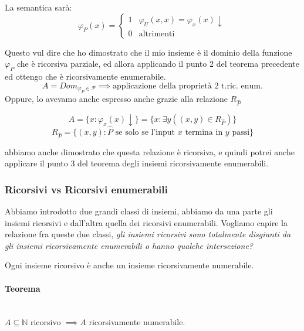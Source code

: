 \documentclass{article}
\begin{document}
La semantica sarà:
\[
    \varphi_P(x)=
    \begin{cases}
        1 & \varphi_U(x,x)=\varphi_x(x)\downarrow\\
        0 & \text{altrimenti}
    \end{cases}
\]

Questo vul dire che ho dimostrato che il mio insieme è il dominio della
funzione $\varphi_P$ che è ricorsiva parziale, ed allora applicando
il punto 2 del teorema precedente ed ottengo che è ricorsivamente
enumerabile.
$$A=Dom_{\varphi_P\in\mathcal{P}}\implies\text{applicazione della proprietà 2 t.ric. enum.}$$
Oppure, lo avevamo anche espresso anche grazie alla relazione $R_{\hat{P}}$

$$A=\{x:\varphi_x(x)\downarrow\}=\{x:\exists y((x,y)\in R_{\hat{P}})\}$$
$$R_{\hat{P}}=\{(x,y):\hat{P}\text{ se solo se l'input }x\text{ termina in }y \text{ passi}\}$$

abbiamo anche dimostrato che questa relazione è ricorsiva, e quindi potrei anche applicare il punto
3 del teorema degli insiemi ricorsivamente enumerabili.

\subsubsection{Ricorsivi vs Ricorsivi enumerabili}
Abbiamo introdotto due grandi classi di insiemi, abbiamo da una parte gli insiemi ricorsivi e dall'altra
quella dei ricorsivi enumerabili. Vogliamo capire la relazione fra queste due classi, \textit{gli
insiemi ricorsivi sono totalmente disgiunti da gli insiemi ricorsivamente enumerabili o hanno
qualche intersezione?}

Ogni insieme ricorsivo è anche un insieme ricorsivamente numerabile.
\paragraph{Teorema}\mbox{}\\
$A\subseteq\mathbb{N}$ ricorsivo $\implies A$ ricorsivamente numerabile.
\end{document}
